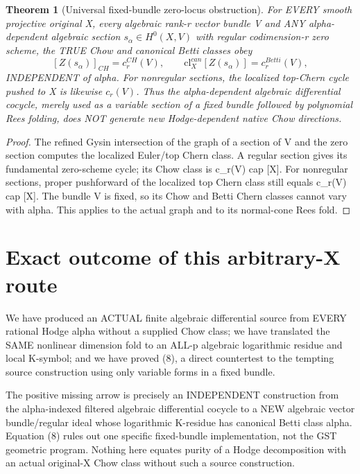 \documentclass[11pt]{article}
\newtheorem{theorem}{Theorem}[section]
\begin{document}
\begin{theorem}[Universal fixed-bundle zero-locus obstruction]
For EVERY smooth projective original X,
every algebraic rank-r vector bundle V and
ANY alpha-dependent algebraic section
$s_\alpha\in H^0(X,V)$ with regular
codimension-r zero scheme,
the TRUE Chow and canonical Betti classes obey
\[
 \boxed{
 [Z(s_\alpha)]_{CH}=c_r^{CH}(V),
 \qquad
 \mathrm{cl}^{can}_X[Z(s_\alpha)]
        =c_r^{Betti}(V),
 }                                                     \tag{8}
\]
INDEPENDENT of alpha.
For nonregular sections, the localized
top-Chern cycle pushed to X is likewise
$c_r(V)$. Thus the alpha-dependent
algebraic differential cocycle,
merely used as a variable section of
a fixed bundle followed by polynomial
Rees folding, does NOT generate new
Hodge-dependent native Chow directions.
\end{theorem}
\begin{proof}
The refined Gysin intersection of
the graph of a section of V and the
zero section computes the localized
Euler/top Chern class.
A regular section gives its
fundamental zero-scheme cycle; its
Chow class is c_r(V) cap [X].
For nonregular sections, proper
pushforward of the localized
top Chern class still equals
c_r(V) cap [X].
The bundle V is fixed,
so its Chow and Betti Chern
classes cannot vary with alpha.
This applies to the actual graph
and to its normal-cone Rees fold.
\end{proof}

\section{Exact outcome of this arbitrary-X route}
We have produced an ACTUAL finite algebraic
differential source from EVERY rational
Hodge alpha without a supplied Chow class;
we have translated the SAME nonlinear
dimension fold to an ALL-p algebraic
logarithmic residue and local K-symbol;
and we have proved (8), a direct
countertest to the tempting source
construction using only variable
forms in a fixed bundle.

The positive missing arrow is precisely
an INDEPENDENT construction from the
alpha-indexed filtered algebraic
differential cocycle to a NEW
algebraic vector bundle/regular ideal
whose logarithmic K-residue has
canonical Betti class alpha.
Equation (8) rules out one
specific fixed-bundle implementation,
not the GST geometric program.
Nothing here equates purity
of a Hodge decomposition with an
actual original-X Chow class
without such a source construction.
\end{document}
